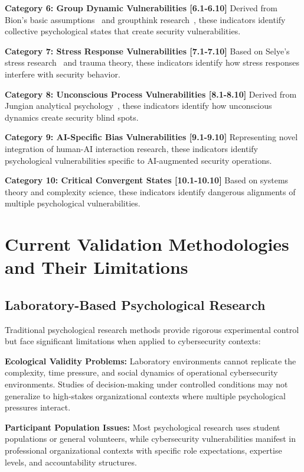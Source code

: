 \documentclass[11pt,a4paper]{article}
\begin{document}
\textbf{Category 6: Group Dynamic Vulnerabilities [6.1-6.10]} Derived from Bion's basic assumptions~\cite{bion1961} and groupthink research~\cite{janis1972}, these indicators identify collective psychological states that create security vulnerabilities.

\textbf{Category 7: Stress Response Vulnerabilities [7.1-7.10]} Based on Selye's stress research~\cite{selye1956} and trauma theory, these indicators identify how stress responses interfere with security behavior.

\textbf{Category 8: Unconscious Process Vulnerabilities [8.1-8.10]} Derived from Jungian analytical psychology~\cite{jung1969}, these indicators identify how unconscious dynamics create security blind spots.

\textbf{Category 9: AI-Specific Bias Vulnerabilities [9.1-9.10]} Representing novel integration of human-AI interaction research, these indicators identify psychological vulnerabilities specific to AI-augmented security operations.

\textbf{Category 10: Critical Convergent States [10.1-10.10]} Based on systems theory and complexity science, these indicators identify dangerous alignments of multiple psychological vulnerabilities.

\section{Current Validation Methodologies and Their Limitations}

\subsection{Laboratory-Based Psychological Research}

Traditional psychological research methods provide rigorous experimental control but face significant limitations when applied to cybersecurity contexts:

\textbf{Ecological Validity Problems:} Laboratory environments cannot replicate the complexity, time pressure, and social dynamics of operational cybersecurity environments. Studies of decision-making under controlled conditions may not generalize to high-stakes organizational contexts where multiple psychological pressures interact.

\textbf{Participant Population Issues:} Most psychological research uses student populations or general volunteers, while cybersecurity vulnerabilities manifest in professional organizational contexts with specific role expectations, expertise levels, and accountability structures.
\end{document}
